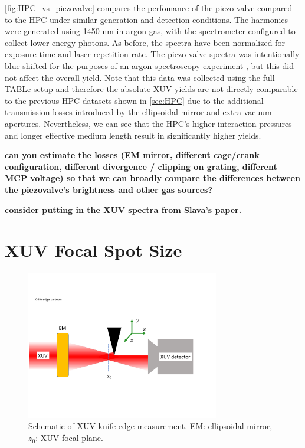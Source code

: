 \cref{fig:HPC_vs_piezovalve} compares the perfomance of the piezo valve compared to the HPC under similar generation and detection conditions. The harmonics were generated using 1450 nm in argon gas, with the spectrometer configured to collect lower energy photons. As before, the spectra have been normalized for exposure time and laser repetition rate. The piezo valve spectra was intentionally blue-shifted for the purposes of an argon spectroscopy experiment \cite{hagemanComplexAttosecondTransientAbsorption2020}, but this did not affect the overall yield. Note that this data was collected using the full TABLe setup and therefore the absolute XUV yields are not directly comparable to the previous HPC datasets shown in \cref{sec:HPC} due to the additional transmission losses introduced by the ellipsoidal mirror and extra vacuum apertures. Nevertheless, we can see that the HPC's higher interaction pressures and longer effective medium length result in significantly higher yields.

\textbf{can you estimate the losses (EM mirror, different cage/crank configuration, different divergence / clipping on grating, different MCP voltage) so that we can broadly compare the differences between the piezovalve's brightness and other gas sources?}


\textbf{consider putting in the XUV spectra from Slava's paper.}

\section{XUV Focal Spot Size}
\label{sec:XUV_knife_edge}

\begin{figure}
	\centering
	\includegraphics[width=0.75\textwidth]{figures/chap3/knife_edge_cartoon.pdf}
	\caption{Schematic of XUV knife edge measurement. EM: ellipsoidal mirror, $z_0$: XUV focal plane.}
	\label{fig:knife_edge_cartoon}
\end{figure}


